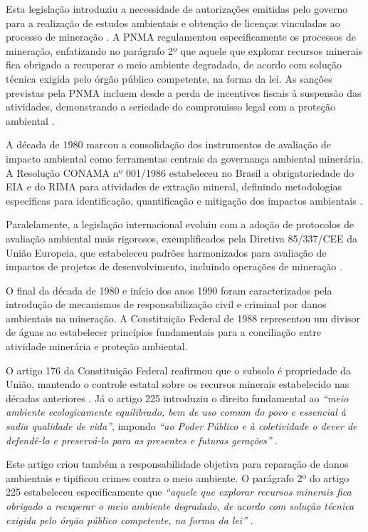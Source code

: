 Esta legislação introduziu a necessidade de autorizações emitidas pelo governo para a realização de estudos ambientais e obtenção de licenças vinculadas ao processo de mineração \cite{jazida2022leis}. A PNMA regulamentou especificamente os processos de mineração, enfatizando no parágrafo 2º que aquele que explorar recursos minerais fica obrigado a recuperar o meio ambiente degradado, de acordo com solução técnica exigida pelo órgão público competente, na forma da lei. As sanções previstas pela PNMA incluem desde a perda de incentivos fiscais à suspensão das atividades, demonstrando a seriedade do compromisso legal com a proteção ambiental \cite{jazida2022leis}.

A década de 1980 marcou a consolidação dos instrumentos de avaliação de impacto ambiental como ferramentas centrais da governança ambiental minerária. A Resolução CONAMA nº 001/1986 estabeleceu no Brasil a obrigatoriedade do EIA e do RIMA para atividades de extração mineral, definindo metodologias específicas para identificação, quantificação e mitigação dos impactos ambientais \cite{conama1986resolucao001}.

Paralelamente, a legislação internacional evoluiu com a adoção de protocolos de avaliação ambiental mais rigorosos, exemplificados pela Diretiva 85/337/CEE da União Europeia, que estabeleceu padrões harmonizados para avaliação de impactos de projetos de desenvolvimento, incluindo operações de mineração \cite{eu1985diretiva337}.

O final da década de 1980 e início dos anos 1990 foram caracterizados pela introdução de mecanismos de responsabilização civil e criminal por danos ambientais na mineração. A Constituição Federal de 1988 \cite{brasil1988constituicao} representou um divisor de águas ao estabelecer princípios fundamentais para a conciliação entre atividade minerária e proteção ambiental.

O artigo 176 da Constituição Federal reafirmou que o subsolo é propriedade da União, mantendo o controle estatal sobre os recursos minerais estabelecido nas décadas anteriores \cite{brasil1988constituicao}. Já o artigo 225 introduziu o direito fundamental ao \textit{``meio ambiente ecologicamente equilibrado, bem de uso comum do povo e essencial à sadia qualidade de vida''}, impondo \textit{``ao Poder Público e à coletividade o dever de defendê-lo e preservá-lo para as presentes e futuras gerações''} \cite{jazida2022leis}.

Este artigo criou também a responsabilidade objetiva para reparação de danos ambientais e tipificou crimes contra o meio ambiente. O parágrafo 2º do artigo 225 estabeleceu especificamente que \textit{``aquele que explorar recursos minerais fica obrigado a recuperar o meio ambiente degradado, de acordo com solução técnica exigida pelo órgão público competente, na forma da lei''} \cite{jazida2022leis}.

